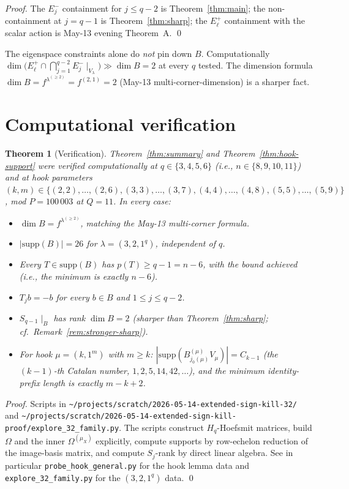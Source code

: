 \documentclass[11pt]{article}
\newtheorem{theorem}{Theorem}
\theoremstyle{definition}
\newcommand{\Hq}{H_q}
\newcommand{\Om}{\Omega}
\newcommand{\supp}{\mathrm{supp}}
\begin{document}
\begin{proof}
The $E_j^-$ containment for $j \le q - 2$ is Theorem~\ref{thm:main};
the non-containment at $j = q - 1$ is Theorem~\ref{thm:sharp}; the
$E_\ell^+$ containment with the scalar action is May-13 evening
Theorem~A.
\qed
\end{proof}

The eigenspace constraints alone do \emph{not} pin down $B$.
Computationally
$\dim\bigl(E_\ell^+\cap\bigcap_{j=1}^{q - 2} E_j^-\!\mid_{V_\lambda}\bigr)
\gg \dim B = 2$ at every $q$ tested.  The dimension formula
$\dim B = f^{\lambda^{(\ge 2)}} = f^{(2, 1)} = 2$ (May-13
multi-corner-dimension) is a sharper fact.

\section{Computational verification}\label{sec:verify}

\begin{theorem}[Verification]\label{thm:verify}
Theorem~\ref{thm:summary} and Theorem~\ref{thm:hook-support} were
verified computationally at $q \in \{3, 4, 5, 6\}$ (i.e., $n \in
\{8, 9, 10, 11\}$) and at hook parameters $(k, m) \in \{(2, 2), \ldots,
(2, 6), (3, 3), \ldots, (3, 7), (4, 4), \ldots, (4, 8), (5, 5),
\ldots, (5, 9)\}$, mod $P = 100\,003$ at $Q = 11$.  In every case:
\begin{itemize}[topsep=0.3em,itemsep=0.1em]
\item $\dim B = f^{\lambda^{(\ge 2)}}$, matching the May-13 multi-corner
  formula.
\item $|\supp(B)| = 26$ for $\lambda = (3, 2, 1^q)$, independent of $q$.
\item Every $T \in \supp(B)$ has $p(T) \ge q - 1 = n - 6$, with the
  bound achieved (i.e., the minimum is exactly $n - 6$).
\item $T_j b = -b$ for every $b \in B$ and $1 \le j \le q - 2$.
\item $S_{q - 1}\!\mid_B$ has rank $\dim B = 2$ (sharper than
  Theorem~\ref{thm:sharp}; cf.\ Remark~\ref{rem:stronger-sharp}).
\item For hook $\mu = (k, 1^m)$ with $m \ge k$:
  $|\supp(B^{(\mu)}_{j_0(\mu)} V_\mu)| = C_{k - 1}$ (the
  $(k-1)$-th Catalan number, $1, 2, 5, 14, 42, \ldots$), and the
  minimum identity-prefix length is exactly $m - k + 2$.
\end{itemize}
\end{theorem}

\begin{proof}
Scripts in
\texttt{\textasciitilde/projects/scratch/2026-05-14-extended-sign-kill-32/}
and
\texttt{\textasciitilde/projects/scratch/2026-05-14-extended-sign-kill-proof/explore\_32\_family.py}.
The scripts construct $\Hq$-Hoefsmit matrices, build $\Om$ and the
inner $\Om^{(\mu_X)}$ explicitly, compute supports by row-echelon
reduction of the image-basis matrix, and compute $S_j$-rank by
direct linear algebra.  See in particular
\texttt{probe\_hook\_general.py} for the hook lemma data and
\texttt{explore\_32\_family.py} for the $(3, 2, 1^q)$ data.
\qed
\end{proof}
\end{document}

